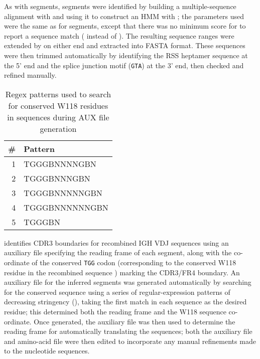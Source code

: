\subsubsubsection{\jh}

\noindent As with \vh segments, \jh segments were identified by building a multiple-sequence alignment with  and using it to construct an HMM with ; the parameters used were the same as for \vh segments, except that there was no minimum score for  to report a sequence match ( instead of ). The resulting sequence ranges were extended by  on either end and extracted into FASTA format. These sequences were then trimmed automatically by identifying the RSS heptamer sequence at the 5' end and the splice junction motif (\texttt{GTA}) at the 3' end, then checked and refined manually.

\begin{wraptable}{r}{5.5cm}
\caption{Regex patterns used to search for conserved W118 residues in \jh sequences during AUX file generation}\label{tab:jh-aux-patterns}
\begin{tabular}{r>{\ttseries}l}\toprule  
\# & Pattern \\\midrule
1 & TGGGBNNNNGBN\\
2 & TGGGBNNNGBN\\
3 & TGGGBNNNNNGBN\\
4 & TGGGBNNNNNNGBN\\
5 & TGGGBN\\\bottomrule
\end{tabular}
\end{wraptable}

 \parencite{ye2013igblast} identifies CDR3 boundaries for recombined IGH VDJ sequences using an auxiliary file specifying the reading frame of each \jh segment, along with the co-ordinate of the conserved \texttt{TGG} codon (corresponding to the conserved W118 residue in the recombined sequence \parencite{lefranc2014immunoglobulins}) marking the CDR3/FR4 boundary. An auxiliary file for the inferred \jh segments was generated automatically by searching for the conserved sequence using a series of regular-expression patterns of decreasing stringency (), taking the first match in each sequence as the desired residue; this determined both the reading frame and the W118 sequence co-ordinate. Once generated, the auxiliary file was then used to determine the reading frame for automatically translating the \jh sequences; both the auxiliary file and amino-acid  file were then edited to incorporate any manual refinements made to the \jh nucleotide sequences.

